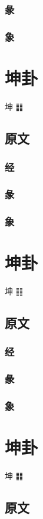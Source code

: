 \documentclass[12pt,oneside]{book}
\begin{document}
\subsection{彖}
\subsection{象}

\chapter{坤卦}
坤 ䷁

\section{原文}
\subsection{经}
\subsection{彖}
\subsection{象}

\chapter{坤卦}
坤 ䷁

\section{原文}
\subsection{经}
\subsection{彖}
\subsection{象}

\chapter{坤卦}
坤 ䷁

\section{原文}
\end{document}
